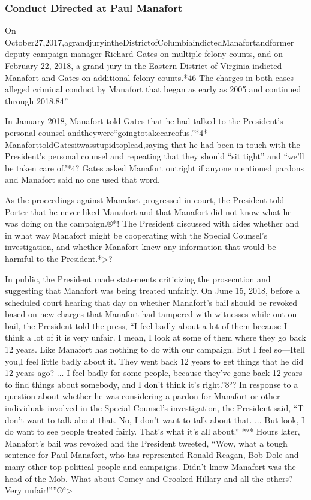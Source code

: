 \subsubsection{Conduct Directed at Paul Manafort}

On October27,2017,agrandjuryintheDistrictofColumbiaindictedManafortandformer deputy campaign manager Richard Gates on multiple felony counts, and on February 22, 2018, a grand jury in the Eastern District of Virginia indicted Manafort and Gates on additional felony counts.*46 The charges in both cases alleged criminal conduct by Manafort that began as early as 2005 and continued through 2018.84”

In January 2018, Manafort told Gates that he had talked to the President's personal counsel andtheywere“goingtotakecareofus.”*4* ManaforttoldGatesitwasstupidtoplead,saying that he had been in touch with the President's personal counsel and repeating that they should “sit tight” and “we'll be taken care of.'*4? Gates asked Manafort outright if anyone mentioned pardons and Manafort said no one used that word.

As the proceedings against Manafort progressed in court, the President told Porter that he never liked Manafort and that Manafort did not know what he was doing on the campaign.®*! The President discussed with aides whether and in what way Manafort might be cooperating with the Special Counsel's investigation, and whether Manafort knew any information that would be harmful to the President.*>?

In public, the President made statements criticizing the prosecution and suggesting that Manafort was being treated unfairly. On June 15, 2018, before a scheduled court hearing that day on whether Manafort's bail should be revoked based on new charges that Manafort had tampered with witnesses while out on bail, the President told the press, “I feel badly about a lot of them because I think a lot of it is very unfair. I mean, I look at some of them where they go back 12 years. Like Manafort has nothing to do with our campaign. But I feel so—Itell you,I feel little badly about it. They went back 12 years to get things that he did 12 years ago? ... I feel badly for some people, because they've gone back 12 years to find things about somebody, and I don't think it's right.”8°? In response to a question about whether he was considering a pardon for Manafort or other individuals involved in the Special Counsel's investigation, the President said, “T don't want to talk about that. No, I don't want to talk about that. ... But look, I do want to see people treated fairly. That's what it's all about.” *°* Hours later, Manafort's bail was revoked and the President tweeted, “Wow, what a tough sentence for Paul Manafort, who has represented Ronald Reagan, Bob Dole and many other top political people and campaigns. Didn't know Manafort was the head of the Mob. What about Comey and Crooked Hillary and all the others? Very unfair!””®°>

